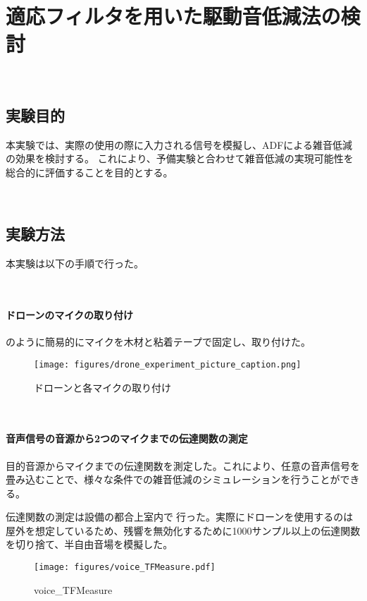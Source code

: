 \
\chapter{適応フィルタを用いた駆動音低減法の検討}\label{adf-practice}

\
\section{実験目的}\label{purpose-practice}

本実験では、実際の使用の際に入力される信号を模擬し、ADFによる雑音低減の効果を検討する。
これにより、予備実験と合わせて雑音低減の実現可能性を総合的に評価することを目的とする。

\
\section{実験方法}\label{instruction-practice}

本実験は以下の手順で行った。

\
\subsubsection{ドローンのマイクの取り付け}\label{installment-mic}

のように簡易的にマイクを木材と粘着テープで固定し、取り付けた。

\begin{figure}[H]
\centering
\texttt{[image: figures/drone\_experiment\_picture\_caption.png]}
\caption{ドローンと各マイクの取り付け}
\label{fig:drone_experiment}
\end{figure}

\
\subsubsection{音声信号の音源から2つのマイクまでの伝達関数の測定}\label{observation-tf}

目的音源からマイクまでの伝達関数を測定した。これにより、任意の音声信号を畳み込むことで、様々な条件での雑音低減のシミュレーションを行うことができる。

伝達関数の測定は設備の都合上室内で行った。実際にドローンを使用するのは屋外を想定しているため、残響を無効化するために1000サンプル以上の伝達関数を切り捨て、半自由音場を模擬した。

\begin{figure}[H]
\centering
\texttt{[image: figures/voice\_TFMeasure.pdf]}
\caption{voice\_TFMeasure}
\end{figure}

